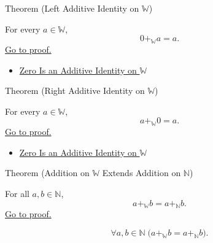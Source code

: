 \begin{theorembox}{Theorem (Left Additive Identity on \texorpdfstring{$\mathbb{W}$}{W})}
\begin{theorem}
\label{thm:left-additive-identity-on-w}
For every $a\in\mathbb{W}$,
\[
0+_{\mathbb{W}}a=a.
\]
\hyperref[prf:left-additive-identity-on-w]{Go to proof.}
\end{theorem}
\end{theorembox}

\begin{dependencies}
\begin{itemize}
  \item \hyperref[thm:zero-additive-identity-on-w]{Zero Is an Additive Identity on $\mathbb{W}$}
\end{itemize}
\end{dependencies}

\begin{theorembox}{Theorem (Right Additive Identity on \texorpdfstring{$\mathbb{W}$}{W})}
\begin{theorem}
\label{thm:right-additive-identity-on-w}
For every $a\in\mathbb{W}$,
\[
a+_{\mathbb{W}}0=a.
\]
\hyperref[prf:right-additive-identity-on-w]{Go to proof.}
\end{theorem}
\end{theorembox}

\begin{dependencies}
\begin{itemize}
  \item \hyperref[thm:zero-additive-identity-on-w]{Zero Is an Additive Identity on $\mathbb{W}$}
\end{itemize}
\end{dependencies}

\begin{theorembox}{Theorem (Addition on \texorpdfstring{$\mathbb{W}$}{W} Extends Addition on \texorpdfstring{$\mathbb{N}$}{N})}
\begin{theorem}
\label{thm:addition-on-w-extends-addition-on-n}
For all $a,b\in\mathbb{N}$,
\[
a+_{\mathbb{W}}b=a+_{\mathbb{N}}b.
\]
\hyperref[prf:addition-on-w-extends-addition-on-n]{Go to proof.}
\end{theorem}
\end{theorembox}

\begin{remark*}
\[
\forall a,b\in\mathbb{N}\;
\bigl(a+_{\mathbb{W}}b=a+_{\mathbb{N}}b\bigr).
\]
\end{remark*}

